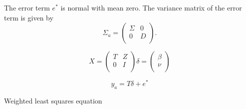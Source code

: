 \documentclass[12pt, a4paper]{article}
\begin{document}
The error term $e^{*}$ is normal with mean zero. The variance
matrix of the error term is given by
\begin{equation}
\Sigma_{a} = \left(%
\begin{array}{cc}
\Sigma & 0 \\
0 & D \\
\end{array}%
\right).
\end{equation}

\begin{equation}
X = \left(%
\begin{array}{cc}
T & Z \\
0 & I \\
\end{array}%
\right)
\delta = \left(%
\begin{array}{c}
\beta  \\
\nu  \\
\end{array}%
\right)
\end{equation}



\begin{equation}
y_{a} = T \delta + e^{*}
\end{equation}

Weighted least squares equation


\newpage





\end{document}
